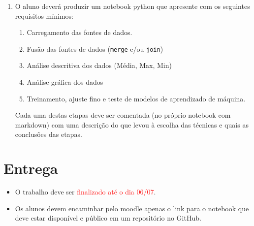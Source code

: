 \documentclass{article}
\begin{document}
\begin{enumerate}
    \item  O aluno deverá produzir um notebook python que apresente com os seguintes requisitos mínimos: 
    \begin{enumerate}
        \item Carregamento das fontes de dados.
        \item Fusão das fontes de dados (\texttt{merge} e/ou \texttt{join})
        \item Análise descritiva dos dados (Média, Max, Min)
        \item Análise gráfica dos dados
        \item Treinamento, ajuste fino e teste de modelos de aprendizado de máquina. 
    \end{enumerate}
    Cada uma destas etapas deve ser comentada (no próprio notebook com markdown) com uma descrição do que levou à escolha das técnicas e quais as conclusões das etapas.
\end{enumerate}

\section{Entrega}

\begin{itemize}
    \item O trabalho deve ser \textcolor{red}{finalizado até o dia 06/07}. 
    \item Os alunos devem encaminhar pelo moodle apenas o link para o notebook que deve estar disponível e público em um repositório no GitHub.
\end{itemize}
 



%
%
\end{document}
